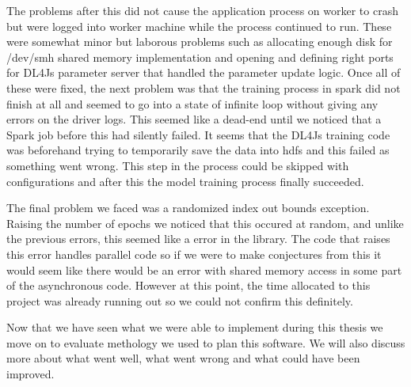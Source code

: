 The problems after this did not cause the application process on worker to crash but were logged into worker machine while the process continued to run.
These were somewhat minor but laborous problems such as allocating enough disk for /dev/smh shared memory implementation and opening and defining right ports for DL4Js parameter server that handled the parameter update logic.
Once all of these were fixed, the next problem was that the training process in spark did not finish at all and seemed to go into a state of infinite loop without giving any errors on the driver logs.
This seemed like a dead-end until we noticed that a Spark job before this had silently failed.
It seems that the DL4Js training code was beforehand trying to temporarily save the data into hdfs and this failed as something went wrong.
This step in the process could be skipped with configurations and after this the model training process finally succeeded.

The final problem we faced was a randomized index out bounds exception.
Raising the number of epochs we noticed that this occured at random, and unlike the previous errors, this seemed like a error in the library.
The code that raises this error handles parallel code so if we were to make conjectures from this it would seem like there would be an error with shared memory access in some part of the asynchronous code.
However at this point, the time allocated to this project was already running out so we could not confirm this definitely.

Now that we have seen what we were able to implement during this thesis we move on to evaluate methology we used to plan this software.
We will also discuss more about what went well, what went wrong and what could have been improved.